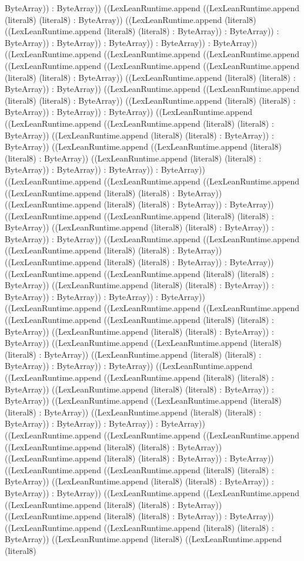\documentclass[11pt]{article}
\begin{document}
ByteArray)) : ByteArray)) ((LexLeanRuntime.append ((LexLeanRuntime.append (literal8) (literal8) : ByteArray)) ((LexLeanRuntime.append (literal8) ((LexLeanRuntime.append (literal8) (literal8) : ByteArray)) : ByteArray)) : ByteArray)) : ByteArray)) : ByteArray)) : ByteArray)) : ByteArray)) ((LexLeanRuntime.append ((LexLeanRuntime.append ((LexLeanRuntime.append ((LexLeanRuntime.append ((LexLeanRuntime.append ((LexLeanRuntime.append (literal8) (literal8) : ByteArray)) ((LexLeanRuntime.append (literal8) (literal8) : ByteArray)) : ByteArray)) ((LexLeanRuntime.append ((LexLeanRuntime.append (literal8) (literal8) : ByteArray)) ((LexLeanRuntime.append (literal8) (literal8) : ByteArray)) : ByteArray)) : ByteArray)) ((LexLeanRuntime.append ((LexLeanRuntime.append ((LexLeanRuntime.append (literal8) (literal8) : ByteArray)) ((LexLeanRuntime.append (literal8) (literal8) : ByteArray)) : ByteArray)) ((LexLeanRuntime.append ((LexLeanRuntime.append (literal8) (literal8) : ByteArray)) ((LexLeanRuntime.append (literal8) (literal8) : ByteArray)) : ByteArray)) : ByteArray)) : ByteArray)) ((LexLeanRuntime.append ((LexLeanRuntime.append ((LexLeanRuntime.append ((LexLeanRuntime.append (literal8) (literal8) : ByteArray)) ((LexLeanRuntime.append (literal8) (literal8) : ByteArray)) : ByteArray)) ((LexLeanRuntime.append ((LexLeanRuntime.append (literal8) (literal8) : ByteArray)) ((LexLeanRuntime.append (literal8) (literal8) : ByteArray)) : ByteArray)) : ByteArray)) ((LexLeanRuntime.append ((LexLeanRuntime.append ((LexLeanRuntime.append (literal8) (literal8) : ByteArray)) ((LexLeanRuntime.append (literal8) (literal8) : ByteArray)) : ByteArray)) ((LexLeanRuntime.append ((LexLeanRuntime.append (literal8) (literal8) : ByteArray)) ((LexLeanRuntime.append (literal8) (literal8) : ByteArray)) : ByteArray)) : ByteArray)) : ByteArray)) : ByteArray)) ((LexLeanRuntime.append ((LexLeanRuntime.append ((LexLeanRuntime.append ((LexLeanRuntime.append ((LexLeanRuntime.append (literal8) (literal8) : ByteArray)) ((LexLeanRuntime.append (literal8) (literal8) : ByteArray)) : ByteArray)) ((LexLeanRuntime.append ((LexLeanRuntime.append (literal8) (literal8) : ByteArray)) ((LexLeanRuntime.append (literal8) (literal8) : ByteArray)) : ByteArray)) : ByteArray)) ((LexLeanRuntime.append ((LexLeanRuntime.append ((LexLeanRuntime.append (literal8) (literal8) : ByteArray)) ((LexLeanRuntime.append (literal8) (literal8) : ByteArray)) : ByteArray)) ((LexLeanRuntime.append ((LexLeanRuntime.append (literal8) (literal8) : ByteArray)) ((LexLeanRuntime.append (literal8) (literal8) : ByteArray)) : ByteArray)) : ByteArray)) : ByteArray)) ((LexLeanRuntime.append ((LexLeanRuntime.append ((LexLeanRuntime.append ((LexLeanRuntime.append (literal8) (literal8) : ByteArray)) ((LexLeanRuntime.append (literal8) (literal8) : ByteArray)) : ByteArray)) ((LexLeanRuntime.append ((LexLeanRuntime.append (literal8) (literal8) : ByteArray)) ((LexLeanRuntime.append (literal8) (literal8) : ByteArray)) : ByteArray)) : ByteArray)) ((LexLeanRuntime.append ((LexLeanRuntime.append ((LexLeanRuntime.append (literal8) (literal8) : ByteArray)) ((LexLeanRuntime.append (literal8) (literal8) : ByteArray)) : ByteArray)) ((LexLeanRuntime.append ((LexLeanRuntime.append (literal8) (literal8) : ByteArray)) ((LexLeanRuntime.append (literal8) ((LexLeanRuntime.append (literal8) 
\end{document}

